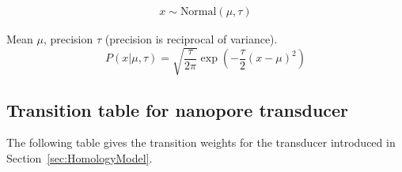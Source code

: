 \documentclass[10pt]{article}
\newcommand{\secref}[1]{Section~\ref{sec:#1}}
\newcommand{\seclabel}[1]{\label{sec:#1}}
\begin{document}
\begin{eqnarray*}
x \sim \mbox{Normal}(\mu,\tau)
\end{eqnarray*}


Mean $\mu$, precision $\tau$ (precision is reciprocal of variance).
\[
P(x|\mu,\tau)
 = \sqrt{\frac{\tau}{2\pi}} \exp \left( -\frac{\tau}{2}(x-\mu)^2 \right)
\]


\subsection{Transition table for nanopore transducer}
\seclabel{TransducerTransitionTable}

The following table gives the transition weights for the transducer introduced in \secref{HomologyModel}.

\small
\end{document}
